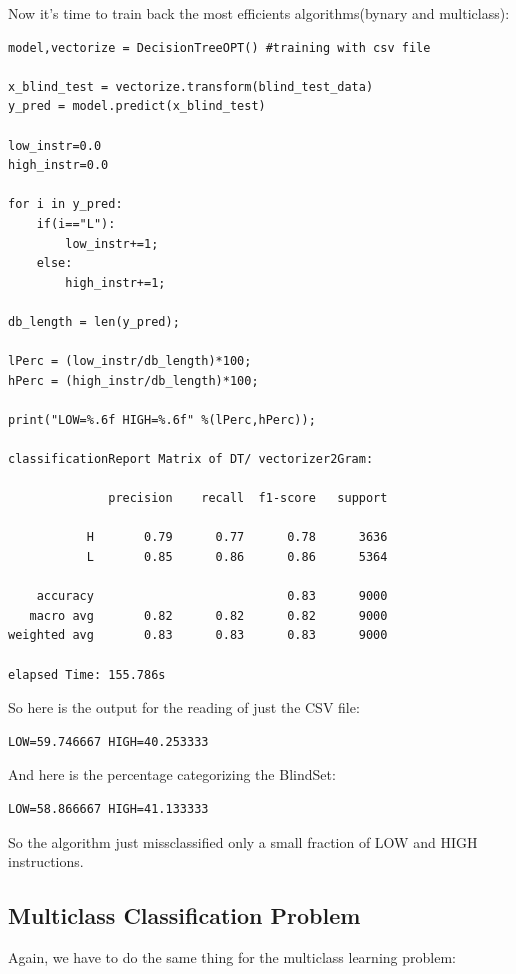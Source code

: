 \documentclass{article}
\begin{document}
Now it's time to train back the most efficients algorithms(bynary and multiclass):

\begin{verbatim}
model,vectorize = DecisionTreeOPT() #training with csv file

x_blind_test = vectorize.transform(blind_test_data)
y_pred = model.predict(x_blind_test)

low_instr=0.0
high_instr=0.0

for i in y_pred:
    if(i=="L"):
        low_instr+=1;
    else:
        high_instr+=1;

db_length = len(y_pred);

lPerc = (low_instr/db_length)*100;
hPerc = (high_instr/db_length)*100;
        
print("LOW=%.6f HIGH=%.6f" %(lPerc,hPerc));

classificationReport Matrix of DT/ vectorizer2Gram:

              precision    recall  f1-score   support

           H       0.79      0.77      0.78      3636
           L       0.85      0.86      0.86      5364

    accuracy                           0.83      9000
   macro avg       0.82      0.82      0.82      9000
weighted avg       0.83      0.83      0.83      9000

elapsed Time: 155.786s

\end{verbatim}
So here is the output for the reading of just the CSV file:
\begin{center}
\begin{verbatim}
LOW=59.746667 HIGH=40.253333
\end{verbatim}
\end{center}
And here is the percentage categorizing the BlindSet:
\begin{center}
\begin{verbatim}
LOW=58.866667 HIGH=41.133333
\end{verbatim}
\end{center}
So the algorithm just missclassified only a small fraction of LOW and HIGH instructions.\\


\subsection{Multiclass Classification Problem}
Again, we have to do the same thing for the multiclass learning problem:\\
\end{document}
